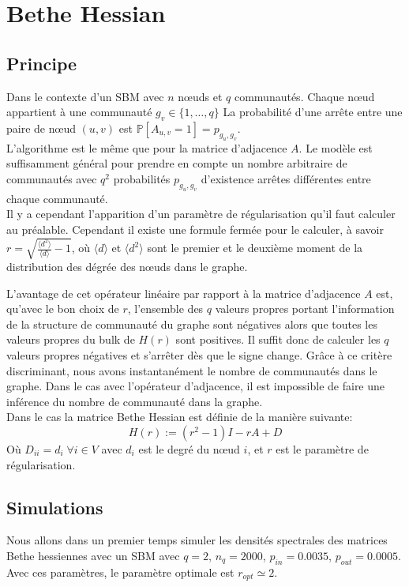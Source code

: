 \section{Bethe Hessian}
\subsection{Principe}
Dans le contexte d'un SBM avec $n$ nœuds et $q$ communautés.
Chaque nœud appartient à une communauté $g_v \in \{1, \dots, q \}$
La probabilité d'une arrête entre une paire de nœud $(u, v)$ est $\mathbb{P}[A_{u,v} = 1] = p_{g_u,g_v}$.\\

L'algorithme est le même que pour la matrice d'adjacence $A$. 
Le modèle est suffisamment général pour prendre en compte un nombre arbitraire de communautés avec $q^2$ probabilités $p_{g_u,g_v}$ d’existence arrêtes différentes entre chaque communauté.\\

Il y a cependant l'apparition d'un paramètre de régularisation qu'il faut calculer au préalable.
Cependant il existe une formule fermée pour le calculer, à savoir $r= \sqrt{\frac{\langle d^2\rangle }{\langle d\rangle }- 1}$, où $\langle d\rangle$ et $\langle d^2\rangle$ sont le premier et le deuxième moment de la distribution des dégrée des nœuds dans le graphe.

L'avantage de cet opérateur linéaire par rapport à la matrice d'adjacence $A$ est, qu'avec le bon choix de $r$, l'ensemble des $q$ valeurs propres portant l'information de la structure de communauté du graphe sont négatives alors que toutes les valeurs propres du bulk de $H(r)$ sont positives.
Il suffit donc de calculer les $q$ valeurs propres négatives et s’arrêter dès que le signe change.
Grâce à ce critère discriminant, nous avons instantanément le nombre de communautés dans le graphe.
Dans le cas avec l'opérateur d'adjacence, il est impossible de faire une inférence du nombre de communauté dans la graphe.\\



Dans le cas la matrice Bethe Hessian est définie de la manière suivante:
\begin{equation}
	H(r) := (r^2 - 1)I - rA + D
\end{equation}
Où $D_{ii} = d_i \; \forall i \in V$ avec $d_i$ est le degré du nœud $i$, et $r$ est le paramètre de régularisation.\\
\subsection{Simulations}
Nous allons dans un premier temps simuler les densités spectrales des matrices Bethe hessiennes avec un SBM avec $q = 2$, $n_q=2000$, $p_{in} = 0.0035$, $p_{out} = 0.0005$.
Avec ces paramètres, le paramètre optimale est $r_{opt}\simeq2$.\\

